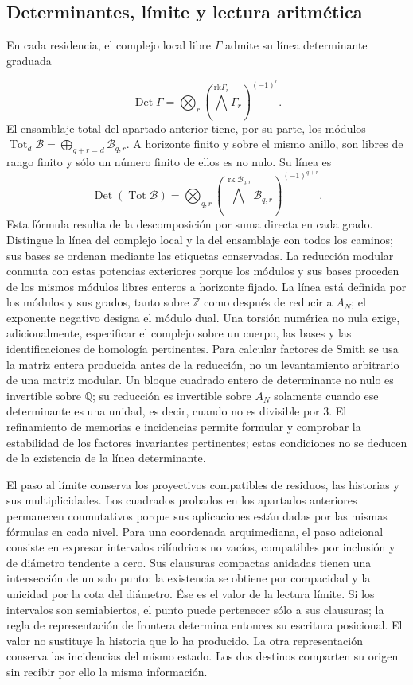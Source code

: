 \subsection{Determinantes, límite y lectura aritmética}
\label{iv:cont:determinantes}
En cada residencia, el complejo local libre \(\Gamma\) admite su línea determinante graduada

\[
\operatorname{Det}\Gamma=
\bigotimes_r\left(\bigwedge^{\mathrm{rk}\Gamma_r}\Gamma_r\right)^{(-1)^r}.
\]
El ensamblaje total del apartado anterior tiene, por su parte, los módulos \(\operatorname{Tot}_d\mathcal B=\bigoplus_{q+r=d}\mathcal B_{q,r}\). A horizonte finito y sobre el mismo anillo, son libres de rango finito y sólo un número finito de ellos es no nulo. Su línea es
\[
\operatorname{Det}(\operatorname{Tot}\mathcal B)=
\bigotimes_{q,r}
\left(\bigwedge^{\operatorname{rk}\mathcal B_{q,r}}
\mathcal B_{q,r}\right)^{(-1)^{q+r}}.
\]
Esta fórmula resulta de la descomposición por suma directa en cada grado. Distingue la línea del complejo local y la del ensamblaje con todos los caminos; sus bases se ordenan mediante las etiquetas conservadas. La reducción modular conmuta con estas potencias exteriores porque los módulos y sus bases proceden de los mismos módulos libres enteros a horizonte fijado.
La línea está definida por los módulos y sus grados, tanto sobre \(\mathbb Z\) como después de reducir a \(A_N\); el exponente negativo designa el módulo dual. Una torsión numérica no nula exige, adicionalmente, especificar el complejo sobre un cuerpo, las bases y las identificaciones de homología pertinentes. Para calcular factores de Smith se usa la matriz entera producida antes de la reducción, no un levantamiento arbitrario de una matriz modular. Un bloque cuadrado entero de determinante no nulo es invertible sobre \(\mathbb Q\); su reducción es invertible sobre \(A_N\) solamente cuando ese determinante es una unidad, es decir, cuando no es divisible por \(3\). El refinamiento de memorias e incidencias permite formular y comprobar la estabilidad de los factores invariantes pertinentes; estas condiciones no se deducen de la existencia de la línea determinante.

El paso al límite conserva los proyectivos compatibles de residuos, las historias y sus multiplicidades. Los cuadrados probados en los apartados anteriores permanecen conmutativos porque sus aplicaciones están dadas por las mismas fórmulas en cada nivel. Para una coordenada arquimediana, el paso adicional consiste en expresar intervalos cilíndricos no vacíos, compatibles por inclusión y de diámetro tendente a cero. Sus clausuras compactas anidadas tienen una intersección de un solo punto: la existencia se obtiene por compacidad y la unicidad por la cota del diámetro. Ése es el valor de la lectura límite. Si los intervalos son semiabiertos, el punto puede pertenecer sólo a sus clausuras; la regla de representación de frontera determina entonces su escritura posicional. El valor no sustituye la historia que lo ha producido. La otra representación conserva las incidencias del mismo estado. Los dos destinos comparten su origen sin recibir por ello la misma información.

